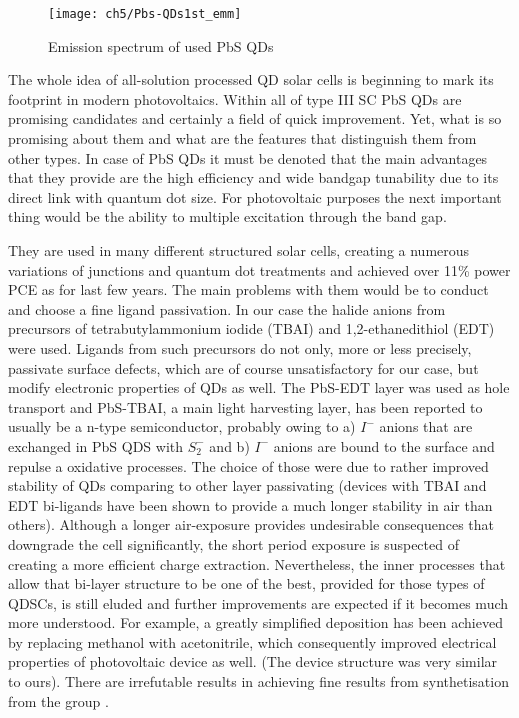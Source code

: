 \begin{figure}[H]
\center
\texttt{[image: ch5/Pbs-QDs1st\_emm]}
\caption{Emission spectrum of used PbS QDs \cite{2011}}
\end{figure}

The whole idea of all-solution processed QD solar cells is beginning to mark its footprint in modern photovoltaics. Within all of type III SC PbS QDs are promising candidates and certainly a field of quick improvement. Yet, what is so promising about them and what are the features that distinguish them from other types. 
In case of PbS QDs it must be denoted that the main advantages that they provide are the high efficiency and wide bandgap tunability due to its direct link with quantum dot size. For photovoltaic purposes the next important thing would be the ability to multiple excitation through the band gap. 

They are used in many different structured solar cells, creating a numerous variations of junctions and quantum dot treatments and achieved over 11\% power PCE as for last few years. The main problems with them would be to conduct and choose a fine ligand passivation. In our case the halide anions from precursors of tetrabutylammonium iodide (TBAI) and 1,2-ethanedithiol (EDT) were used. Ligands from such precursors do not only, more or less precisely, passivate surface defects, which are of course unsatisfactory for our case, but modify electronic properties of QDs as well. The PbS-EDT layer was used as hole transport and  PbS-TBAI, a main light harvesting layer,  has been reported to usually be a n-type semiconductor, probably owing to a) $I^{-}$  anions that are exchanged in PbS QDS with $S_2^{-}$ and b) $I^{-}$ anions are bound to the surface and repulse a oxidative processes. The choice of those were due to rather improved stability of QDs comparing to other layer passivating (devices with TBAI and EDT bi-ligands have been shown to provide a much longer stability in air than others). Although a longer air-exposure provides undesirable consequences that downgrade the cell significantly, the short period exposure is suspected of creating a more efficient charge extraction. Nevertheless, the inner processes that allow that bi-layer structure to be one of the best, provided for those types of QDSCs, is still eluded and further improvements are expected if it becomes much more understood. For example, a greatly simplified deposition has been achieved by replacing methanol with acetonitrile, which consequently improved electrical properties of photovoltaic device as well. (The device structure was very similar to ours). There are irrefutable results in achieving fine results from synthetisation from the group\cite{Wang2017} \cite{Hu2016}.

